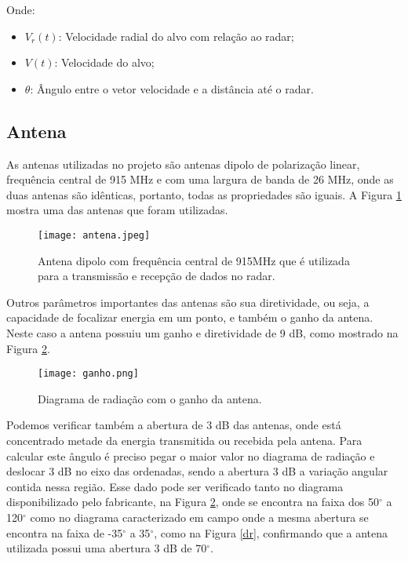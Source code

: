 Onde:
\begin{itemize}
    \item $V_r(t)$: Velocidade radial do alvo com relação ao radar;
    \item $V(t)$: Velocidade do alvo;
    \item $\theta$: Ângulo entre o vetor velocidade e a distância até o radar.
\end{itemize}


\subsection{Antena}

As antenas utilizadas no projeto são antenas dipolo de polarização linear, frequência central de 915 MHz e com uma largura de banda de 26 MHz, onde as duas antenas são idênticas, portanto, todas as propriedades são iguais. A Figura \ref{antena} mostra uma das antenas que foram utilizadas. 

\begin{figure}[H]
    \centering
   \texttt{[image: antena.jpeg]}
   \caption{Antena dipolo com frequência central de 915MHz que é utilizada para a transmissão e recepção de dados no radar.}
   \label{antena}
    \end{figure}

Outros parâmetros importantes das antenas são sua diretividade, ou seja, a capacidade de focalizar energia em um ponto, e também o ganho da antena. Neste caso a antena possuiu um ganho e diretividade de 9 dB, como mostrado na Figura \ref{ganho}. 

\begin{figure}[H]
    \centering
   \texttt{[image: ganho.png]}
   \caption{Diagrama de radiação com o ganho da antena.}
   \label{ganho}
    \end{figure}

Podemos verificar também a abertura de 3 dB das antenas, onde está concentrado metade da energia transmitida ou recebida pela antena. Para calcular este ângulo é preciso pegar o maior valor no diagrama de radiação e deslocar 3 dB no eixo das ordenadas, sendo a abertura 3 dB a variação angular contida nessa região. Esse dado pode ser verificado tanto no diagrama disponibilizado pelo fabricante, na Figura \ref{ganho}, onde se encontra na faixa dos 50$^{\circ}$ a 120$^{\circ}$ como no diagrama caracterizado em campo onde a mesma abertura se encontra na faixa de -35$^{\circ}$ a 35$^{\circ}$, como na Figura \ref{dr}, confirmando que a antena utilizada possui uma abertura 3 dB de 70$^{\circ}$. 

